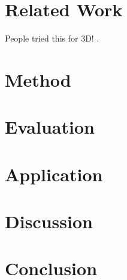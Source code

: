 \documentclass{llncs}
\begin{document}
\section{Related Work}
People tried this for 3D! \cite{BogovicHJ13}.

\section{Method}

\section{Evaluation}

\section{Application}

\section{Discussion}

\section{Conclusion}

%
%


\end{document}
